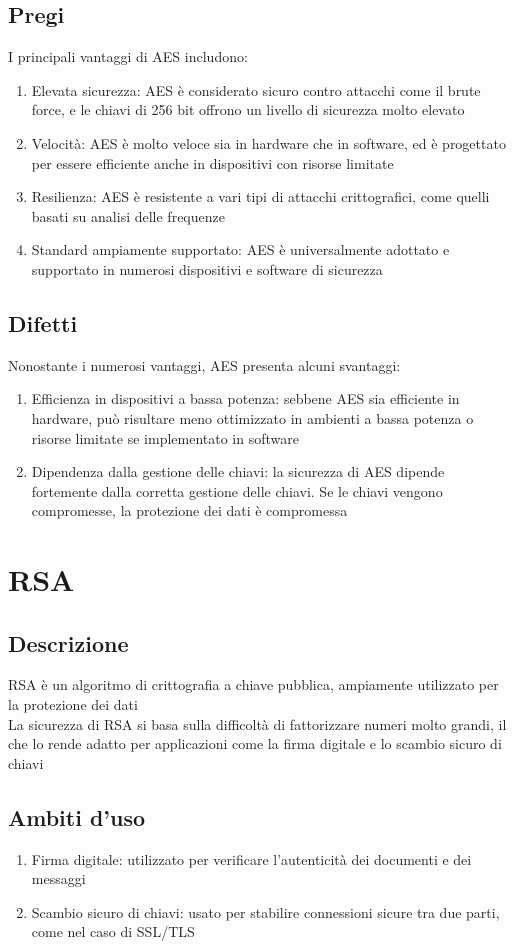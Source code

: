 \documentclass[10pt,oneside,a4paper]{article}
\begin{document}
\subsection{Pregi}
I principali vantaggi di AES includono:
\begin{enumerate}
\item Elevata sicurezza: AES è considerato sicuro contro attacchi come il brute force, e le chiavi di 256 bit offrono un livello di sicurezza molto elevato
\item Velocità: AES è molto veloce sia in hardware che in software, ed è progettato per essere efficiente anche in dispositivi con risorse limitate
\item Resilienza: AES è resistente a vari tipi di attacchi crittografici, come quelli basati su analisi delle frequenze
\item Standard ampiamente supportato: AES è universalmente adottato e supportato in numerosi dispositivi e software di sicurezza
\end{enumerate}
\subsection{Difetti}
Nonostante i numerosi vantaggi, AES presenta alcuni svantaggi:
\begin{enumerate}
\item Efficienza in dispositivi a bassa potenza: sebbene AES sia efficiente in hardware, può risultare meno ottimizzato in ambienti a bassa potenza o risorse limitate se implementato in software
\item Dipendenza dalla gestione delle chiavi: la sicurezza di AES dipende fortemente dalla corretta gestione delle chiavi. Se le chiavi vengono compromesse, la protezione dei dati è compromessa
\end{enumerate}
\section{RSA}
\subsection{Descrizione}
RSA è un algoritmo di crittografia a chiave pubblica, ampiamente utilizzato per la protezione dei dati\\
La sicurezza di RSA si basa sulla difficoltà di fattorizzare numeri molto grandi, il che lo rende adatto per applicazioni come la firma digitale e lo scambio sicuro di chiavi
\subsection{Ambiti d'uso}
\begin{enumerate}
\item Firma digitale: utilizzato per verificare l'autenticità dei documenti e dei messaggi
\item Scambio sicuro di chiavi: usato per stabilire connessioni sicure tra due parti, come nel caso di SSL/TLS
\end{enumerate}
\end{document}
